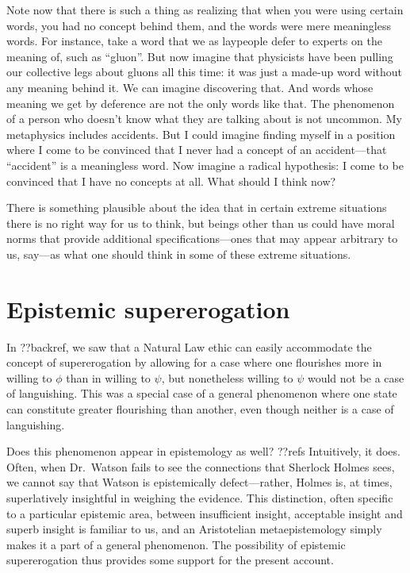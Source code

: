 Note now that there is such a thing as realizing that when you were using certain words, you had no concept behind them, and
the words were mere meaningless words. For instance, take a word that we as laypeople defer to experts on the meaning of, such
as ``gluon''. But now imagine that physicists have been pulling our collective legs about gluons all this time: it was just a 
made-up word without any meaning behind it. We can imagine discovering that. And words whose meaning we get by deference are not
the only words like that. The phenomenon of a person who doesn't know what they are talking about is not uncommon. My metaphysics
includes accidents. But I could imagine finding myself in a position where I come to be convinced that I never had a concept of
an accident---that ``accident'' is a meaningless word. Now imagine a radical hypothesis: I come to be convinced that I have no
concepts at all. What should I think now? 

There is something plausible about the idea that in certain extreme situations there is no right way for us to think,
but beings other than us could have moral norms that provide additional specifications---ones that may appear 
arbitrary to us, say---as what one should think in some of these extreme situations. 

\section{Epistemic supererogation}
In ??backref, we saw that a Natural Law ethic can easily accommodate the concept of supererogation by allowing for a case
where one flourishes more in willing to $\phi$ than in willing to $\psi$, but nonetheless willing to $\psi$ would not be a case of languishing. This was
a special case of a general phenomenon where one state can constitute greater flourishing than another, even though neither
is a case of languishing. 

Does this phenomenon appear in epistemology as well? ??refs  Intuitively, it does. Often, when Dr.~Watson fails to see the 
connections that Sherlock Holmes sees, we cannot say that Watson is epistemically defect---rather, Holmes is, at times, 
superlatively insightful in weighing the evidence. This distinction, often specific to a particular epistemic area, between
insufficient insight, acceptable insight and superb insight is familiar to us, and an Aristotelian metaepistemology simply
makes it a part of a general phenomenon. The possibility of epistemic supererogation thus provides some support for the 
present account.

